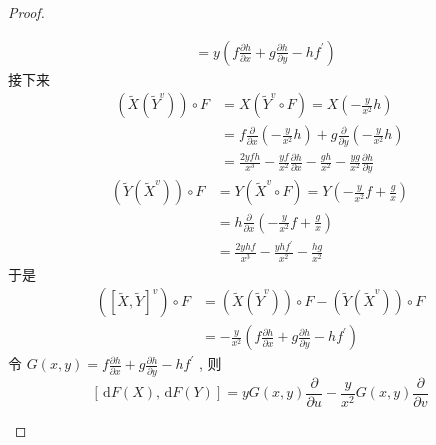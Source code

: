 \documentclass[../main.tex]{subfiles}
\begin{document}
\begin{proof}
\begin{enumerate}
\[\begin{aligned}
         &= y\left( f\frac{\partial h}{\partial x}+ g\frac{\partial h}{\partial y}-hf^{\prime}  \right)     
        \end{aligned}
        \]接下来 \[
        \begin{aligned}
        \left( \tilde{X}\left( \tilde{Y} ^{v}\right)  \right)\circ F&= X\left( \tilde{Y}^{v}\circ F \right)= X\left( -\frac{y }{x^{2} }h  \right)\\ 
         &=  f\frac{\partial }{\partial x}\left( -\frac{y }{x^{2} }h  \right)+ g\frac{\partial }{\partial y}\left( -\frac{y }{x^{2} }h  \right)\\ 
          &= \frac{2yfh }{x^{3} }-\frac{yf }{x^{2} }\frac{\partial h}{\partial x}- \frac{gh }{x^{2} }- \frac{yg }{x^{2} }\frac{\partial h}{\partial y}          
        \end{aligned}
        \] \[
        \begin{aligned}
        \left( \tilde{Y}\left( \tilde{X}^{v} \right)  \right)\circ F&=  Y\left( \tilde{X}^{v}\circ F \right)   = Y\left( -\frac{y }{x^{2} }f+ \frac{g }{x }   \right)\\ 
         &= h\frac{\partial }{\partial x}\left( -\frac{y }{x^{2} }f+ \frac{g }{x }   \right)\\ 
        &= \frac{2yhf }{x^{3} }-\frac{yhf^{\prime}  }{x^{2} }-\frac{hg }{x^{2} }     
        \end{aligned}
        \]于是 \[
        \begin{aligned}
        \left( \left[ \tilde{X},\tilde{Y} \right]^{v}  \right)\circ F&= \left( \tilde{X}\left( \tilde{Y}^{v} \right)  \right)\circ F-\left( \tilde{Y}\left( \tilde{X}^{v} \right)  \right)\circ F\\ 
         &= -\frac{y }{x^{2} }\left( f\frac{\partial h}{\partial x}+ g\frac{\partial h}{\partial y}-hf^{\prime}  \right)      
        \end{aligned}
        \]令 \(  G\left( x,y \right)= f\frac{\partial h}{\partial x}+ g\frac{\partial h}{\partial y}-hf^{\prime}    \) , 则 \[
        \left[ \,\mathrm{d} F\left( X \right),\,\mathrm{d} F\left( Y \right)   \right]= y G\left( x,y \right)\frac{\partial }{\partial u}- \frac{y }{x^{2} }G\left( x,y \right)    \frac{\partial }{\partial v}
        \]


\end{enumerate}
\end{proof}
\end{document}
